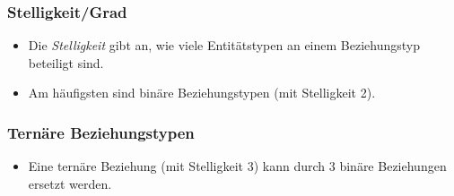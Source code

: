             \subsubsection{Stelligkeit/Grad} %
                \begin{itemize}
                	\item Die \textit{Stelligkeit} gibt an, wie viele Entitätstypen an einem Beziehungstyp beteiligt sind.
                	\item Am häufigsten sind binäre Beziehungstypen (mit Stelligkeit 2).
                \end{itemize}

            \subsubsection{Ternäre Beziehungstypen} %
                \begin{itemize}
                	\item Eine ternäre Beziehung (mit Stelligkeit 3) kann durch 3 binäre Beziehungen ersetzt werden.
                \end{itemize}
            
